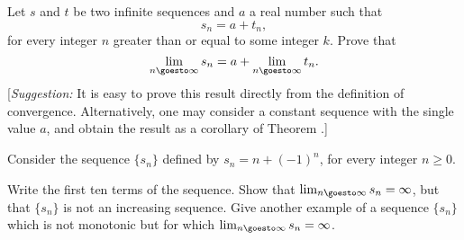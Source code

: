 \begin{exercises}
Let $s$ and $t$ be two infinite sequences
and $a$ a real number such that
\[
s_n = a + t_n
,
\]
for every integer $n$ greater than or equal
to some integer $k$.  Prove that
\[
\lim_{n\goesto\infty} s_n =
a + \lim_{n\goesto\infty} t_n
.
\]
[\emph{Suggestion:} It is easy to prove this
result directly from the definition of convergence.
Alternatively, one may consider a constant sequence
with the single value $a$, and obtain the result
as a corollary of Theorem .]

Consider the sequence $\{ s_n \}$
defined by $s_n = n + (-1)^n$,
for every integer $n \geq 0$.
\begin{exenum}
\x
Write the first ten terms of the sequence.
\x
Show that $\lim_{n\goesto\infty} s_n = \infty$,
but that $\{ s_n \}$ is not an increasing sequence.
\x
Give another example of a sequence $\{ s_n \}$
which is not monotonic but for which
$\lim_{n\goesto\infty} s_n = \infty$.
\end{exenum} 

\end{exercises}
